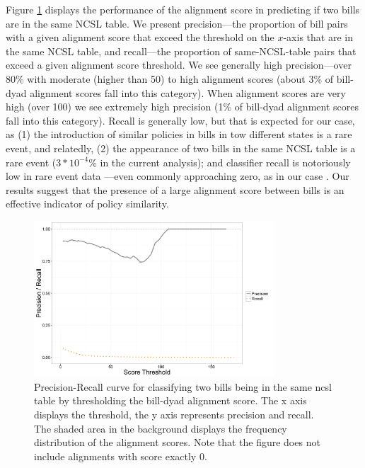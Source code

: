 \documentclass[12pt]{article} %
\begin{document}
Figure \ref{fig:ncsl_prec_rec} displays the performance of the alignment score
in predicting if two bills are in the same NCSL table. We present
precision---the proportion of bill pairs with a given alignment score that
exceed the threshold on the $x$-axis that are in the same NCSL table, and
recall---the proportion of same-NCSL-table pairs that exceed a given alignment
score threshold. We see generally high precision---over 80\% with moderate
(higher than 50) to high alignment scores (about 3\% of bill-dyad alignment
scores fall into this category). When alignment scores are very high (over 100)
we see extremely high precision (1\% of bill-dyad alignment scores fall into
this category). Recall is generally low, but that is expected for our case, as
(1) the introduction of similar policies in bills in tow different states is a
rare event, and relatedly, (2) the appearance of two bills in the same NCSL
table is a rare event ($3*10^{-4}$\% in the current analysis); and classifier recall is notoriously low in rare event data \citep{weiss2000learning}---even commonly approaching zero, as in our case \citep{weiss2004mining}. Our results suggest that the presence of a large alignment score between bills is an effective indicator of policy similarity.


\begin{figure}[ht!]
    \centering
    \includegraphics[width=0.8\textwidth]{figures/ncsl_prec_rec.png}
    \caption{Precision-Recall curve for classifying two bills being in the same
    ncsl table by thresholding the bill-dyad alignment score. The x axis
displays the threshold, the y axis represents precision and recall. The shaded
area in the background displays the frequency distribution of the alignment
scores. Note that the figure does not include alignments with score exactly 0.}
    \label{fig:ncsl_prec_rec}
\end{figure}
\end{document}
